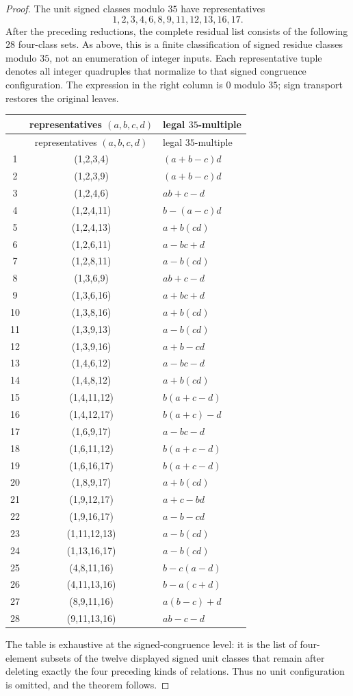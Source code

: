 \begin{proof}
The unit signed classes modulo $35$ have representatives
\[
 1,2,3,4,6,8,9,11,12,13,16,17.
\]
After the preceding reductions, the complete residual list consists of the
following $28$ four-class sets.  As above, this is a finite classification of
signed residue classes modulo $35$, not an enumeration of integer inputs.
Each representative tuple denotes all integer quadruples that normalize to
that signed congruence configuration.  The expression in the right column is
$0$ modulo $35$; sign transport restores the original leaves.
\scriptsize
\begin{longtable}{@{}ccl@{}}
\toprule
& representatives $(a,b,c,d)$ & legal $35$-multiple \\
\midrule
\endfirsthead
\toprule
& representatives $(a,b,c,d)$ & legal $35$-multiple \\
\midrule
\endhead
1&(1,2,3,4)&$(a+b-c)d$\\
2&(1,2,3,9)&$(a+b-c)d$\\
3&(1,2,4,6)&$ab+c-d$\\
4&(1,2,4,11)&$b-(a-c)d$\\
5&(1,2,4,13)&$a+b(cd)$\\
6&(1,2,6,11)&$a-bc+d$\\
7&(1,2,8,11)&$a-b(cd)$\\
8&(1,3,6,9)&$ab+c-d$\\
9&(1,3,6,16)&$a+bc+d$\\
10&(1,3,8,16)&$a+b(cd)$\\
11&(1,3,9,13)&$a-b(cd)$\\
12&(1,3,9,16)&$a+b-cd$\\
13&(1,4,6,12)&$a-bc-d$\\
14&(1,4,8,12)&$a+b(cd)$\\
15&(1,4,11,12)&$b(a+c-d)$\\
16&(1,4,12,17)&$b(a+c)-d$\\
17&(1,6,9,17)&$a-bc-d$\\
18&(1,6,11,12)&$b(a+c-d)$\\
19&(1,6,16,17)&$b(a+c-d)$\\
20&(1,8,9,17)&$a+b(cd)$\\
21&(1,9,12,17)&$a+c-bd$\\
22&(1,9,16,17)&$a-b-cd$\\
23&(1,11,12,13)&$a-b(cd)$\\
24&(1,13,16,17)&$a-b(cd)$\\
25&(4,8,11,16)&$b-c(a-d)$\\
26&(4,11,13,16)&$b-a(c+d)$\\
27&(8,9,11,16)&$a(b-c)+d$\\
28&(9,11,13,16)&$ab-c-d$\\
\bottomrule
\end{longtable}
\normalsize
The table is exhaustive at the signed-congruence level: it is the list of
four-element subsets of the twelve displayed signed unit classes that remain
after deleting exactly the four preceding kinds of relations.  Thus no unit
configuration is omitted, and the theorem follows.
\end{proof}

